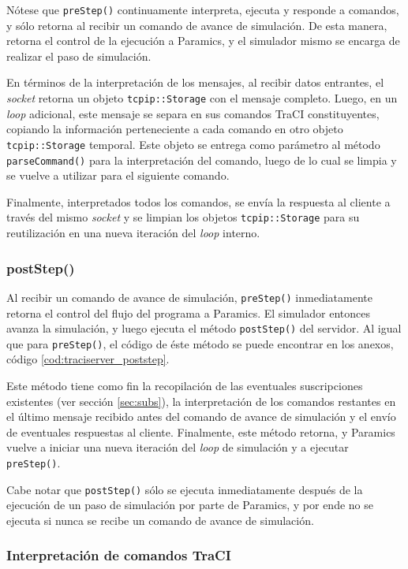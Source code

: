 Nótese que \texttt{preStep()} continuamente interpreta, ejecuta y responde a comandos, y sólo retorna al recibir un comando de avance de simulación. De esta manera, retorna el control de la ejecución a Paramics, y el simulador mismo se encarga de realizar el paso de simulación.

En términos de la interpretación de los mensajes, al recibir datos entrantes, el \emph{socket} retorna un objeto \texttt{tcpip::Storage} con el mensaje completo. Luego, en un \emph{loop} adicional, este mensaje se separa en sus comandos TraCI constituyentes, copiando la información perteneciente a cada comando en otro objeto \texttt{tcpip::Storage} temporal. Este objeto se entrega como parámetro al método \texttt{parseCommand()} para la interpretación del comando, luego de lo cual se limpia y se vuelve a utilizar para el siguiente comando.

Finalmente, interpretados todos los comandos, se envía la respuesta al cliente a través del mismo \emph{socket} y se limpian los objetos \texttt{tcpip::Storage} para su reutilización en una nueva iteración del \emph{loop} interno.

\subsubsection{postStep()} \label{sec:poststep}

Al recibir un comando de avance de simulación, \texttt{preStep()} inmediatamente retorna el control del flujo del programa a Paramics. El simulador entonces avanza la simulación, y luego ejecuta el método \texttt{postStep()} del servidor. Al igual que para \texttt{preStep()}, el código de éste método se puede encontrar en los anexos, código \ref{cod:traciserver_poststep}.

Este método tiene como fin la recopilación de las eventuales suscripciones existentes (ver sección \ref{sec:subs}), la interpretación de los comandos restantes en el último mensaje recibido antes del comando de avance de simulación y el envío de eventuales respuestas al cliente. Finalmente, este método retorna, y Paramics vuelve a iniciar una nueva iteración del \emph{loop} de simulación y a ejecutar \texttt{preStep()}.

Cabe notar que \texttt{postStep()} sólo se ejecuta inmediatamente después de la ejecución de un paso de simulación por parte de Paramics, y por ende no se ejecuta si nunca se recibe un comando de avance de simulación.

\subsubsection{Interpretación de comandos TraCI}

